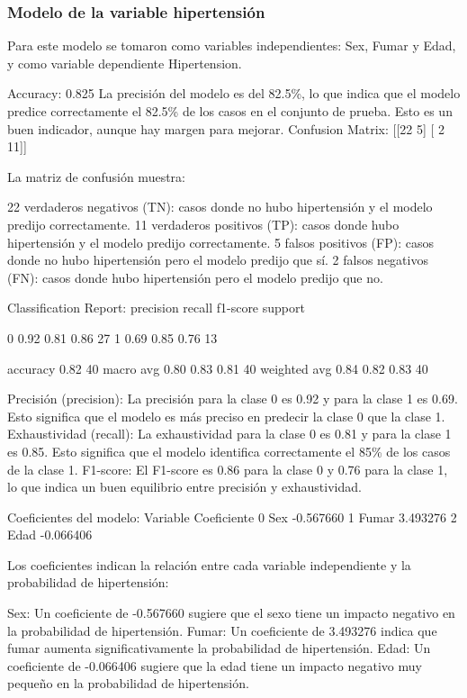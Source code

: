 \documentclass[a4paper, 12pt]{article}
\begin{document}
\subsubsection{Modelo de la variable hipertensión}

Para este modelo se tomaron como variables independientes: Sex, Fumar y Edad, y como
variable dependiente Hipertension.


Accuracy: 0.825
La precisión del modelo es del 82.5\%, lo que indica que el modelo predice correctamente 
el 82.5\% de los casos en el conjunto de prueba. Esto es un buen indicador, aunque hay margen para mejorar.
Confusion Matrix:
[[22  5]
[ 2 11]]

La matriz de confusión muestra:

22 verdaderos negativos (TN): casos donde no hubo hipertensión y el modelo predijo correctamente.
11 verdaderos positivos (TP): casos donde hubo hipertensión y el modelo predijo correctamente.
5 falsos positivos (FP): casos donde no hubo hipertensión pero el modelo predijo que sí.
2 falsos negativos (FN): casos donde hubo hipertensión pero el modelo predijo que no.

Classification Report:
              precision    recall  f1-score   support

           0       0.92      0.81      0.86        27
           1       0.69      0.85      0.76        13

    accuracy                           0.82        40
   macro avg       0.80      0.83      0.81        40
weighted avg       0.84      0.82      0.83        40

Precisión (precision): La precisión para la clase 0 es 0.92 y para la clase 1 es 0.69. Esto significa que el modelo es más preciso en predecir la clase 0 que la clase 1.
Exhaustividad (recall): La exhaustividad para la clase 0 es 0.81 y para la clase 1 es 0.85. Esto significa que el modelo identifica correctamente el 85\% de los casos de la clase 1.
F1-score: El F1-score es 0.86 para la clase 0 y 0.76 para la clase 1, lo que indica un buen equilibrio entre precisión y exhaustividad.

Coeficientes del modelo:
  Variable  Coeficiente
0      Sex    -0.567660
1    Fumar     3.493276
2     Edad    -0.066406

Los coeficientes indican la relación entre cada variable independiente y la probabilidad de hipertensión:

Sex: Un coeficiente de -0.567660 sugiere que el sexo tiene un impacto negativo en la probabilidad de hipertensión.
Fumar: Un coeficiente de 3.493276 indica que fumar aumenta significativamente la probabilidad de hipertensión.
Edad: Un coeficiente de -0.066406 sugiere que la edad tiene un impacto negativo muy pequeño en la probabilidad de hipertensión.
\end{document}
